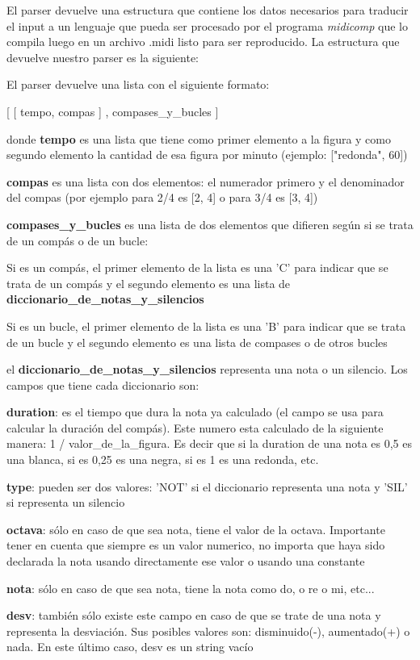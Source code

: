 El parser devuelve una estructura que contiene los datos necesarios para traducir el input a un lenguaje que pueda ser procesado por el programa \textit{midicomp} que lo compila luego en un archivo .midi listo para ser reproducido. La estructura que devuelve nuestro parser es la siguiente:

El parser devuelve una lista con el siguiente formato:

[    [ tempo,  compas   ]   ,     compases\_y\_bucles  ]

donde \textbf{tempo} es una lista que tiene como primer elemento a la figura y como segundo elemento la cantidad de esa figura por minuto (ejemplo: ["redonda", 60])

\textbf{compas} es una lista con dos elementos: el numerador primero y el denominador del compas (por ejemplo para 2/4 es [2, 4] o para 3/4 es [3, 4])

\textbf{compases\_y\_bucles} es una lista de dos elementos que difieren según si se trata de un compás o de un bucle:

Si es un compás, el primer elemento de la lista es una 'C' para indicar que se trata de un compás y el segundo elemento es una lista de \textbf{diccionario\_de\_notas\_y\_silencios}

Si es un bucle, el primer elemento de la lista es una 'B' para indicar que se trata de un bucle y el segundo elemento es una lista de compases o de otros bucles

el \textbf{diccionario\_de\_notas\_y\_silencios} representa una nota o un silencio. Los campos que tiene cada diccionario son:

\textbf{duration}: es el tiempo que dura la nota ya calculado (el campo se usa para calcular la duración del compás). Este numero esta calculado de la siguiente manera: 1 / valor\_de\_la\_figura. Es decir que si la duration de una nota es 0,5 es una blanca, si es 0,25 es una negra, si es 1 es una redonda, etc.

\textbf{type}: pueden ser dos valores: 'NOT' si el diccionario representa una nota y 'SIL' si representa un silencio

\textbf{octava}: sólo en caso de que sea nota, tiene el valor de la octava. Importante tener en cuenta que siempre es un valor numerico, no importa que haya sido declarada la nota usando directamente ese valor o usando una constante

\textbf{nota}: sólo en caso de que sea nota, tiene la nota como do, o re o mi, etc...

\textbf{desv}: también sólo existe este campo en caso de que se trate de una nota y representa la desviación. Sus posibles valores son: disminuido(-), aumentado(+) o nada. En este último caso, desv es un string vacío

